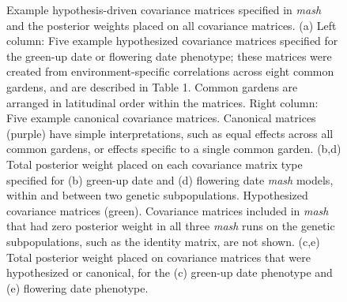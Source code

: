 \documentclass[
  9pt,
  twocolumn,
  twoside]{pnas-new}
\begin{document}
\begin{figure}


\caption{\label{fig-covar}Example hypothesis-driven covariance matrices
specified in \emph{mash} and the posterior weights placed on all
covariance matrices. (a) Left column: Five example hypothesized
covariance matrices specified for the green-up date or flowering date
phenotype; these matrices were created from environment-specific
correlations across eight common gardens, and are described in Table 1.
Common gardens are arranged in latitudinal order within the matrices.
Right column: Five example canonical covariance matrices. Canonical
matrices (purple) have simple interpretations, such as equal effects
across all common gardens, or effects specific to a single common
garden. (b,d) Total posterior weight placed on each covariance matrix
type specified for (b) green-up date and (d) flowering date \emph{mash}
models, within and between two genetic subpopulations. Hypothesized
covariance matrices (green). Covariance matrices included in \emph{mash}
that had zero posterior weight in all three \emph{mash} runs on the
genetic subpopulations, such as the identity matrix, are not shown.
(c,e) Total posterior weight placed on covariance matrices that were
hypothesized or canonical, for the (c) green-up date phenotype and (e)
flowering date phenotype.}

\end{figure}%
\end{document}

